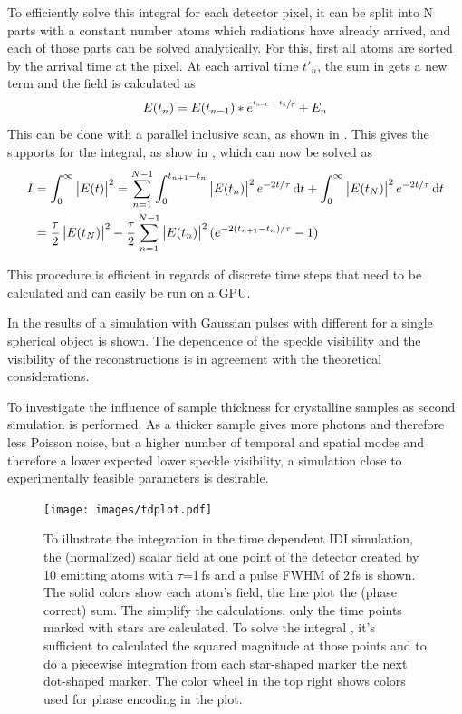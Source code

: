 To efficiently solve this integral for each detector pixel, it can be split into N parts with a constant number atoms which radiations have already arrived, and each of those parts can be solved analytically. For this, first all atoms are sorted by the arrival time at the pixel. At each arrival time $t'_n$, the sum in  gets a new term and the field is calculated as
\begin{equation}
E(t_n)=E(t_{n-1})*e^{\sfrac{t_{n-1}-t_n}{\tau}}+E_n
\end{equation}
 This can be done with a parallel inclusive scan, as shown in . This gives the supports for the integral, as show in , which can now be solved as
\begin{align}
	I&=\int_0^\infty \left| E(t) \right|^2 = \sum_{n=1}^{N-1} \int_0^{t_{n+1}-t_n} \left|E(t_n)\right|^2 e^{-2t/\tau} \dif t +\int_0^\infty \left| E(t_N)\right|^2 e^{-2t/\tau} \dif t \\
	 &=  \frac{\tau}{2}  \left|E(t_N)\right|^2 -  \frac{\tau}{2}\sum_{n=1}^{N-1} \left|E(t_n)\right|^2 (e^{-2 (t_{n+1}-t_n)/\tau} -1 ) 
\end{align}

This procedure is efficient in regards of discrete time steps that need to be calculated and can easily be run on a GPU.

In  the results of a simulation with Gaussian pulses with different for a single spherical object is shown. The dependence of the speckle visibility and the visibility of the reconstructions is in agreement with the theoretical considerations.

To investigate the influence of sample thickness for crystalline samples as second simulation is performed. As a thicker sample gives more photons and therefore less Poisson noise, but a higher number of temporal and spatial modes and therefore a lower expected lower speckle visibility, a simulation close to experimentally feasible parameters is desirable.



\begin{figure}
	   \centering
		\texttt{[image: images/tdplot.pdf]}
	\caption[Integration in Time Dependent IDI Simulation]{To illustrate the integration in the time dependent IDI simulation, the (normalized) scalar field at one point of the detector created by 10 emitting atoms with $\tau$=1\,fs and a pulse FWHM of 2\,fs is shown. The solid colors show each atom's field, the line plot the (phase correct) sum. The simplify the calculations, only the time points marked with stars are calculated. To solve the integral , it's sufficient to calculated the squared magnitude at those points and to do a piecewise integration from each star-shaped marker the next dot-shaped marker. The color wheel in the top right shows colors used for phase encoding in the plot.}
	\label{fig:tdplot}
\end{figure}



